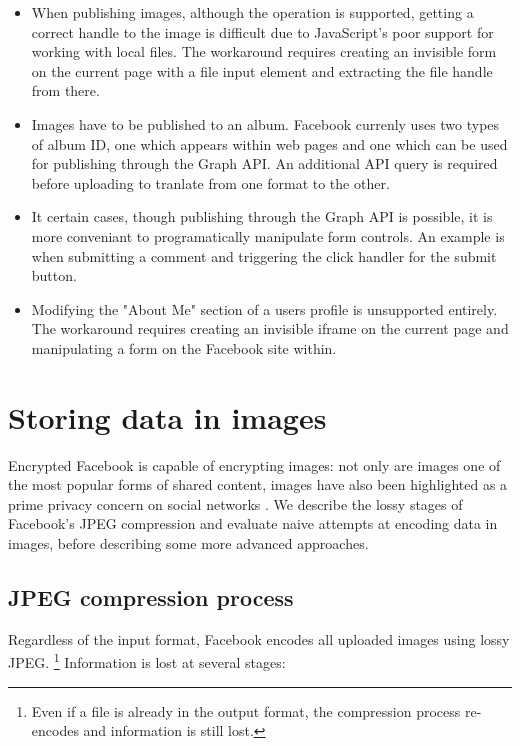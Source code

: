 \begin{itemize}

    \item When publishing images, although the operation is supported, getting a correct handle to the image is difficult due to JavaScript's poor support for working with local files. The workaround requires creating an invisible form on the current page with a file input element and extracting the file handle from there.

    \item Images have to be published to an album. Facebook currenly uses two types of album ID, one which appears within web pages and one which can be used for publishing through the Graph API. An additional API query is required before uploading to tranlate from one format to the other.
    
    \item It certain cases, though publishing through the Graph API is possible, it is more conveniant to programatically manipulate form controls. An example is when submitting a comment and triggering the click handler for the submit button.
    
    \item Modifying the "About Me" section of a users profile is unsupported entirely. The workaround requires creating an invisible iframe on the current page and manipulating a form on the Facebook site within.

\end{itemize}

    
\section{Storing data in images}

Encrypted Facebook is capable of encrypting images: not only are images one of the most popular forms of shared content, images have also been highlighted as a prime privacy concern on social networks \cite{fb-images}. We describe the lossy stages of Facebook's JPEG compression and evaluate naive attempts at encoding data in images, before describing some more advanced approaches.


\subsection{JPEG compression process}

Regardless of the input format, Facebook encodes all uploaded images using lossy JPEG. \footnote{Even if a file is already in the output format, the compression process re-encodes and information is still lost.} Information is lost at several stages:

